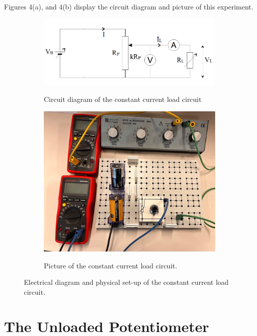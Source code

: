 \documentclass[a4paper]{article}
\begin{document}
Figures 4(a), and 4(b) display the circuit diagram and picture of this
experiment.

\begin{figure}[!ht]
    \centering
    \begin{subfigure}{.5\textwidth}
        \centering
        \includegraphics[width = 0.8\linewidth]{fixed current circuit.png}
        \label{fig:4a}
        \caption{Circuit diagram of the constant current load circuit\cite{report}}
        
    \end{subfigure}%
    \begin{subfigure}{.5\textwidth}
        \centering
        \includegraphics[width = 0.8\linewidth]{fixed currrent picture.png}
        \label{fig:4b}
        \caption{Picture of the constant current load circuit.}
    \end{subfigure}
    \caption{Electrical diagram and physical set-up of the constant current load circuit.}
\end{figure}
\section{The Unloaded Potentiometer}
\end{document}
